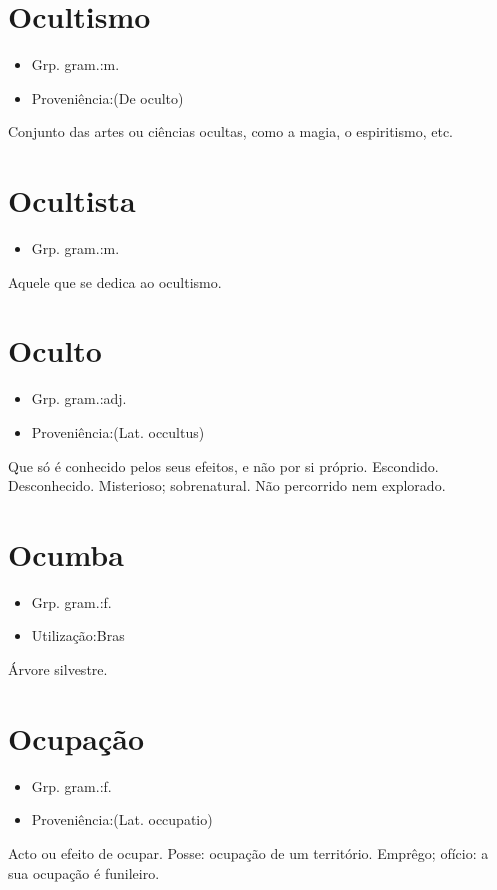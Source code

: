 \section{Ocultismo}
\begin{itemize}
\item {Grp. gram.:m.}
\end{itemize}
\begin{itemize}
\item {Proveniência:(De \textunderscore oculto\textunderscore )}
\end{itemize}
Conjunto das artes ou ciências ocultas, como a magia, o espiritismo, etc.
\section{Ocultista}
\begin{itemize}
\item {Grp. gram.:m.}
\end{itemize}
Aquele que se dedica ao ocultismo.
\section{Oculto}
\begin{itemize}
\item {Grp. gram.:adj.}
\end{itemize}
\begin{itemize}
\item {Proveniência:(Lat. \textunderscore occultus\textunderscore )}
\end{itemize}
Que só é conhecido pelos seus efeitos, e não por si próprio.
Escondido.
Desconhecido.
Misterioso; sobrenatural.
Não percorrido nem explorado.
\section{Ocumba}
\begin{itemize}
\item {Grp. gram.:f.}
\end{itemize}
\begin{itemize}
\item {Utilização:Bras}
\end{itemize}
Árvore silvestre.
\section{Ocupação}
\begin{itemize}
\item {Grp. gram.:f.}
\end{itemize}
\begin{itemize}
\item {Proveniência:(Lat. \textunderscore occupatio\textunderscore )}
\end{itemize}
Acto ou efeito de ocupar.
Posse: \textunderscore ocupação de um território\textunderscore .
Emprêgo; ofício: \textunderscore a sua ocupação é funileiro\textunderscore .
